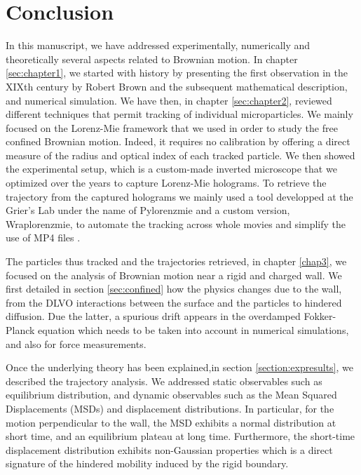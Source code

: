 


















\section{Conclusion}

In this manuscript, we have addressed experimentally, numerically and theoretically several aspects related to  Brownian motion. In chapter \ref{sec:chapter1}, we started with history by presenting the first observation in the XIXth century by Robert Brown and the subsequent mathematical description, and numerical simulation. We have then, in chapter \ref{sec:chapter2}, reviewed different techniques that permit tracking of individual microparticles. We mainly focused on the Lorenz-Mie framework that we used in order to study the free confined Brownian motion. Indeed, it requires no calibration by offering a direct measure of the radius and optical index of each tracked particle. We then showed the experimental setup, which is a custom-made inverted microscope that we optimized over the years to capture Lorenz-Mie holograms. To retrieve the trajectory from the captured holograms we mainly used a tool developped at the Grier's Lab under the name of Pylorenzmie \href{https://github.com/davidgrier/pylorenzmie}{\faGithub} and a custom version, Wraplorenzmie, to automate the tracking across whole movies and simplify the use of MP4 files \href{https://github.com/eXpensia/wraplorenzmie}{\faGithub}.

The particles thus tracked and the trajectories retrieved, in chapter \ref{chap3}, we focused on the analysis of Brownian motion near a rigid and charged wall. We first detailed in section \ref{sec:confined} how the physics changes due to the wall, from the DLVO interactions between the surface and the particles to hindered diffusion. Due the latter, a spurious drift appears in the overdamped Fokker-Planck equation which needs to be taken into account in numerical simulations, and also for force measurements.

Once the underlying theory has been explained,in section \ref{section:expresults}, we described the trajectory analysis. We addressed static observables such as equilibrium distribution, and dynamic observables such as the Mean Squared Displacements (\gls{MSD}s) and displacement distributions. In particular, for the motion perpendicular to the wall, the \gls{MSD} exhibits a normal distribution at short time, and an equilibrium plateau at long time. Furthermore, the short-time displacement distribution exhibits non-Gaussian properties which is a direct signature of the hindered mobility induced by the rigid boundary.

